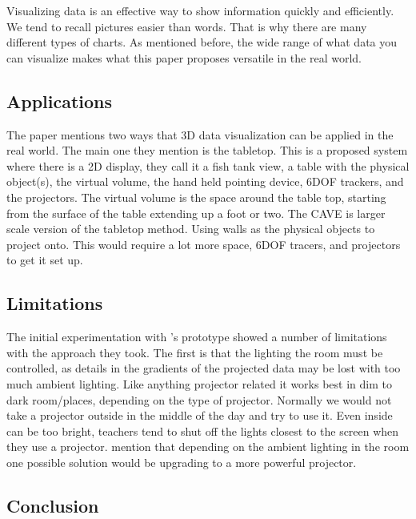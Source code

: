 \documentclass{sig-alternate}
\begin{document}
Visualizing data is an effective way to show information quickly and efficiently. We tend to recall pictures easier than words. That is why there are many different types of charts. As mentioned before, the wide range of what data you can visualize makes what this paper proposes versatile in the real world.      

\subsection{Applications}
\label{sec:Applications}

The paper mentions two ways that 3D data visualization can be applied in the real world. The main one they mention is the tabletop. This is a proposed system where there is a 2D display, they call it a fish tank view, a table with the physical object(s), the virtual volume, the hand held pointing device, 6DOF trackers, and the projectors. The virtual volume is the space around the table top, starting from the surface of the table extending up a foot or two. The CAVE is larger scale version of the tabletop method. Using walls as the physical objects to project onto. This would require a lot more space, 6DOF tracers, and projectors to get it set up.


\subsection{Limitations}
\label{sec:Limitations}

The initial experimentation with \cite{3D}'s prototype showed a number of limitations with the approach they took. The first is that the lighting the room must be controlled, as details in the gradients of the projected data may be lost with too much ambient lighting. Like anything projector related it works best in dim to dark room/places, depending on the type of projector. Normally we would not take a projector outside in the middle of the day and try to use it. Even inside can be too bright, teachers tend to shut off the lights closest to the screen when they use a projector. \cite{3D} mention that depending on the ambient lighting in the room one possible solution would be upgrading to a more powerful projector.  

\subsection{Conclusion}
\label{sec:Conclusion}
\end{document}
